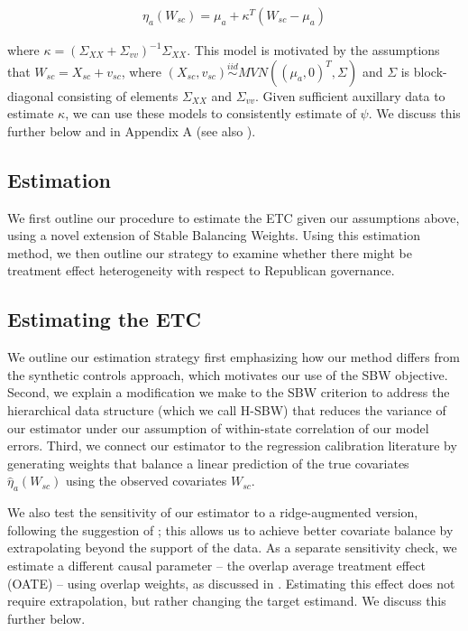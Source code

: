 \documentclass[aoas]{imsart}
\theoremstyle{plain}
\theoremstyle{remark}
\begin{document}
\begin{align*}
\eta_a(W_{sc}) = \mu_a + \kappa^T(W_{sc} - \mu_a)
\end{align*}

where $\kappa = (\Sigma_{XX} + \Sigma_{vv})^{-1}\Sigma_{XX}$. This model is motivated by the assumptions that $W_{sc} = X_{sc} + v_{sc}$, where $(X_{sc}, v_{sc}) \stackrel{iid}\sim MVN((\mu_a, 0)^T, \Sigma)$ and $\Sigma$ is block-diagonal consisting of elements $\Sigma_{XX}$ and $\Sigma_{vv}$. Given sufficient auxillary data to estimate $\kappa$, we can use these models to consistently estimate of $\psi$. We discuss this further below and in Appendix A (see also \cite{gleser1992importance}).

\subsection{Estimation}

We first outline our procedure to estimate the ETC given our assumptions above, using a novel extension of Stable Balancing Weights. Using this estimation method, we then outline our strategy to examine whether there might be treatment effect heterogeneity with respect to Republican governance.

\subsection{Estimating the ETC}

We outline our estimation strategy first emphasizing how our method differs from the synthetic controls approach, which motivates our use of the SBW objective. Second, we explain a modification we make to the SBW criterion to address the hierarchical data structure (which we call H-SBW) that reduces the variance of our estimator under our assumption of within-state correlation of our model errors. Third, we connect our estimator to the regression calibration literature by generating weights that balance a linear prediction of the true covariates $\hat{\eta}_a(W_{sc})$ using the observed covariates $W_{sc}$. 

We also test the sensitivity of our estimator to a ridge-augmented version, following the suggestion of \cite{ben2018augmented}; this allows us to achieve better covariate balance by extrapolating beyond the support of the data. As a separate sensitivity check, we estimate a different causal parameter -- the overlap average treatment effect (OATE) -- using overlap weights, as discussed in \cite{li2018balancing}. Estimating this effect does not require extrapolation, but rather changing the target estimand. We discuss this further below.
\end{document}
